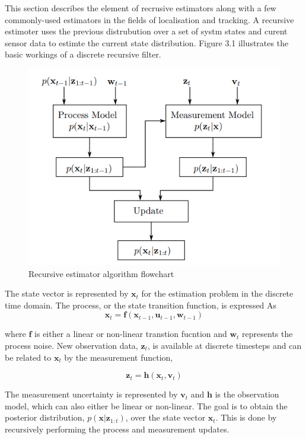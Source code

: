 \label{chap:stateestimation}

\label{sec:stateintro}

\label{sec:stateEKF}

This section describes the element of recrusive estimators along with a few commonly-used estimators in the fields of localisation and tracking. A recursive estimoter uses the previous
distrubution over a set of systm states and curent sensor data to estimte the current state distribution. Figure 3.1 illustrates the basic workings of a discrete recursive filter.

\begin{figure}[H]
    \centering
    \includegraphics[width=0.5\linewidth]{figures/StateEstimation/Recursive Estimation.png}
    \caption{Recursive estimator algorithm flowchart}
    \label{}
\end{figure}

The state vector is represented by $\mathbf{x}_t$ for the estimation problem in the discrete time domain. The process, or the state transition function, is expressed As
\begin{equation}
    \mathbf{x}_t = \mathbf{f}(\mathbf{x}_{t-1},\mathbf{u}_{t-1},\mathbf{w}_{t-1})
\end{equation}

where $\mathbf{f}$ is either a linear or non-linear transtion fucntion and $\mathbf{w}_t$ represents the process noise. New observation data, $\mathbf{z}_t$, is available at
discrete timesteps and can be related to $\mathbf{x}_t$ by the measurement function,

\begin{equation}
    \mathbf{z}_t = \mathbf{h}(\mathbf{x}_t,\mathbf{v}_t)
\end{equation}

The measurement uncertainty is represented by $\mathbf{v}_t$ and $\mathbf{h}$ is the observation model, which can also either be linear or non-linear. The goal is to obtain the
posterior distribution, $p(\mathbf{x}|\mathbf{z}_{1:t})$, over the state vector $\mathbf{x}_t$. This is done by recursively performing the process and measurement updates.


